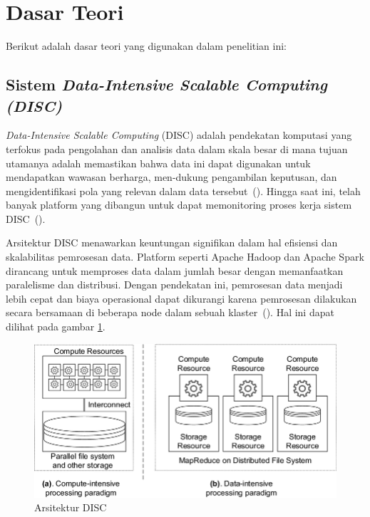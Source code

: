 \section{Dasar Teori}
\label{sec:dasarTeori}

Berikut adalah dasar teori yang digunakan dalam penelitian ini:

\subsection{Sistem \emph{Data-Intensive Scalable Computing (DISC)}}

\emph{Data-Intensive Scalable Computing} (DISC) adalah pendekatan
komputasi yang terfokus pada pengolahan dan analisis data dalam
skala besar di mana tujuan utamanya adalah memastikan bahwa data
ini dapat digunakan untuk mendapatkan wawasan berharga, men-dukung
pengambilan keputusan, dan mengidentifikasi pola yang relevan
dalam data tersebut~(\cite{dantas2020}). Hingga saat ini, telah
banyak platform yang dibangun untuk dapat memonitoring proses
kerja sistem DISC~(\cite{dragan2019}). 

Arsitektur DISC menawarkan keuntungan signifikan dalam hal efisiensi dan skalabilitas pemrosesan data. Platform seperti Apache Hadoop dan Apache Spark dirancang untuk memproses data dalam jumlah besar dengan memanfaatkan paralelisme dan distribusi. Dengan pendekatan ini, pemrosesan data menjadi lebih cepat dan biaya operasional dapat dikurangi karena pemrosesan dilakukan secara bersamaan di beberapa node dalam sebuah klaster~(\cite{dean2008}).
Hal ini dapat dilihat pada gambar \ref{fig:DISCArchitecture}.

\begin{figure}[H]
  \centering
  \includegraphics[scale=0.5]{gambar/DISCArchitecture.png}
  \caption{Arsitektur DISC}
  \label{fig:DISCArchitecture}
\end{figure}

